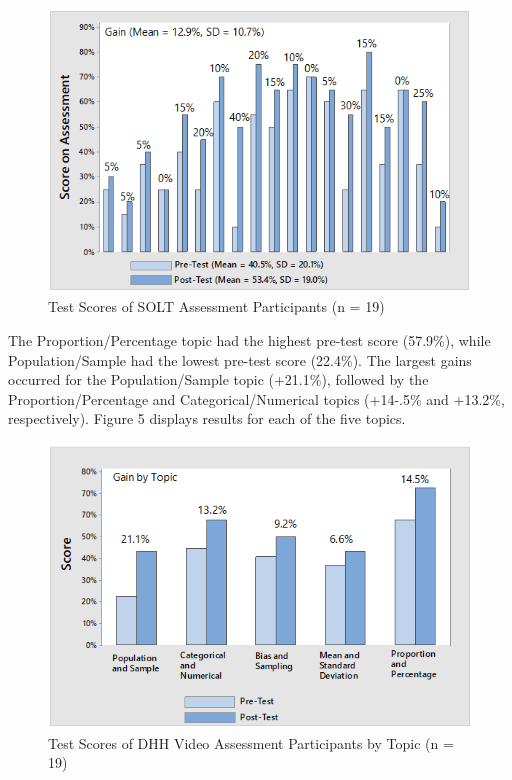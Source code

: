 \documentclass[11.5pt]{sig-alternate} %
\begin{document}
\begin{large}
\begin{figure}[h]
    \centering
    \includegraphics[width=1\linewidth]{Fig_4.png}
    \caption{Test Scores of SOLT Assessment Participants (n = 19)}
\end{figure}

The Proportion/Percentage topic had the highest pre-test score (57.9\%), while Population/Sam\-ple had the lowest pre-test score (22.4\%). The largest gains occurred for the Population/Sample topic (+21.1\%), followed by the Proportion/Per\-centage and Categorical/Numerical topics (+14-.5\% and +13.2\%, respectively). Figure 5 displays results for each of the five topics.

\begin{figure}[h]
    \centering
    \includegraphics[width=1\linewidth]{Fig_5.png}
    \caption{Test Scores of DHH Video Assessment Participants by Topic (n = 19)}
\end{figure}


\end{large}
\end{document}
